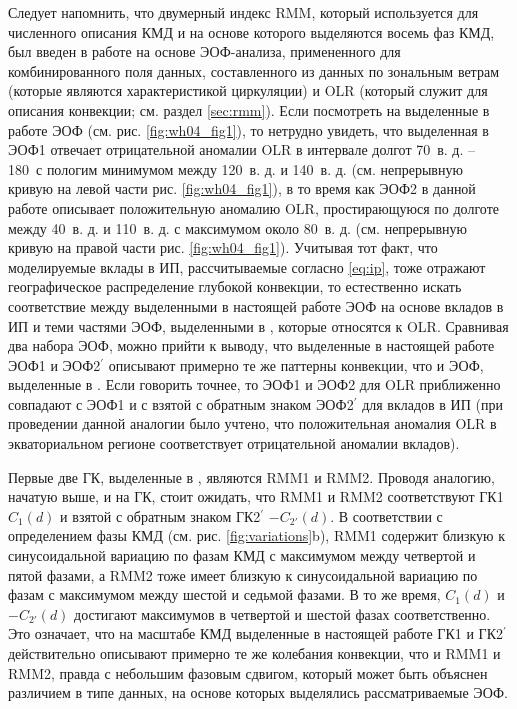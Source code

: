 Следует напомнить, что двумерный индекс RMM, который используется для численного описания КМД и на основе которого выделяются восемь фаз КМД, был введен в работе \cite{Wheeler_Hendon_2004} на основе ЭОФ-анализа, примененного для комбинированного поля данных, составленного из данных по зональным ветрам (которые являются характеристикой циркуляции) и OLR (который служит для описания конвекции; см. раздел \ref{sec:rmm}). Если посмотреть на выделенные в работе \cite{Wheeler_Hendon_2004} ЭОФ (см. рис. \ref{fig:wh04_fig1}), то нетрудно увидеть, что выделенная в \cite{Wheeler_Hendon_2004} ЭОФ1 отвечает отрицательной аномалии OLR в интервале долгот 70\textdegree\ в. д. -- 180\textdegree\ с пологим минимумом между 120\textdegree\ в. д. и 140\textdegree\ в. д. (см. непрерывную кривую на левой части рис. \ref{fig:wh04_fig1}), в то время как ЭОФ2 в данной работе описывает положительную аномалию OLR, простирающуюся по долготе между 40\textdegree\ в. д. и 110\textdegree\ в. д. с максимумом около 80\textdegree\ в. д. (см. непрерывную кривую на правой части рис. \ref{fig:wh04_fig1}). Учитывая тот факт, что моделируемые вклады в ИП, рассчитываемые согласно \eqref{eq:ip}, тоже отражают географическое распределение глубокой конвекции, то естественно искать соответствие между выделенными в настоящей работе ЭОФ на основе вкладов в ИП и теми частями ЭОФ, выделенными в \cite{Wheeler_Hendon_2004}, которые относятся к OLR. Сравнивая два набора ЭОФ, можно прийти к выводу, что выделенные в настоящей работе ЭОФ1 и ЭОФ2$^\prime$ описывают примерно те же паттерны конвекции, что и ЭОФ, выделенные в \cite{Wheeler_Hendon_2004}. Если говорить точнее, то ЭОФ1 и ЭОФ2 для OLR приближенно совпадают с ЭОФ1 и с взятой с обратным знаком ЭОФ2$^\prime$ для вкладов в ИП (при проведении данной аналогии было учтено, что положительная аномалия OLR в экваториальном регионе соответствует отрицательной аномалии вкладов). 

Первые две ГК, выделенные в \cite{Wheeler_Hendon_2004}, являются RMM1 и RMM2. Проводя аналогию, начатую выше, и на ГК, стоит ожидать, что RMM1 и RMM2 соответствуют ГК1 $C_1(d)$ и взятой с обратным знаком ГК2$^\prime$ $-C_{2'}(d)$. В соответствии с определением фазы КМД (см. рис. \ref{fig:variations}{b}), RMM1 содержит близкую к синусоидальной вариацию по фазам КМД с максимумом между четвертой и пятой фазами, а RMM2 тоже имеет близкую к синусоидальной вариацию по фазам с максимумом между шестой и седьмой фазами. В то же время, $C_1(d)$ и $-C_{2'}(d)$ достигают максимумов в четвертой и шестой фазах соответственно. Это означает, что на масштабе КМД выделенные в настоящей работе ГК1 и ГК2$^\prime$ действительно описывают примерно те же колебания конвекции, что и RMM1 и RMM2, правда с небольшим фазовым сдвигом, который может быть объяснен различием в типе данных, на основе которых выделялись рассматриваемые ЭОФ.

